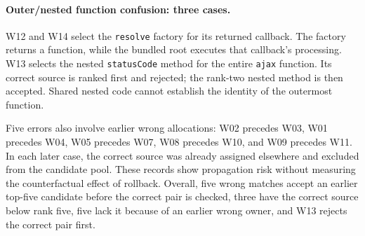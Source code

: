 \paragraph{Outer/nested function confusion: three cases.}
W12 and W14 select the \texttt{resolve} factory for its returned callback. The factory returns a function, while the bundled root executes that callback's processing. W13 selects the nested \texttt{statusCode} method for the entire \texttt{ajax} function. Its correct source is ranked first and rejected; the rank-two nested method is then accepted. Shared nested code cannot establish the identity of the outermost function.

Five errors also involve earlier wrong allocations: W02 precedes W03, W01 precedes W04, W05 precedes W07, W08 precedes W10, and W09 precedes W11. In each later case, the correct source was already assigned elsewhere and excluded from the candidate pool. These records show propagation risk without measuring the counterfactual effect of rollback. Overall, five wrong matches accept an earlier top-five candidate before the correct pair is checked, three have the correct source below rank five, five lack it because of an earlier wrong owner, and W13 rejects the correct pair first.
